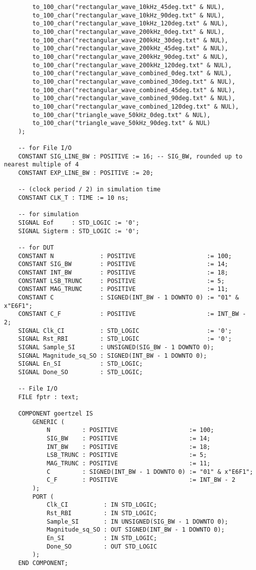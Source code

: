 \begin{lstlisting}
        to_100_char("rectangular_wave_10kHz_45deg.txt" & NUL),
        to_100_char("rectangular_wave_10kHz_90deg.txt" & NUL),
        to_100_char("rectangular_wave_10kHz_120deg.txt" & NUL),
        to_100_char("rectangular_wave_200kHz_0deg.txt" & NUL),
        to_100_char("rectangular_wave_200kHz_30deg.txt" & NUL),
        to_100_char("rectangular_wave_200kHz_45deg.txt" & NUL),
        to_100_char("rectangular_wave_200kHz_90deg.txt" & NUL),
        to_100_char("rectangular_wave_200kHz_120deg.txt" & NUL),
        to_100_char("rectangular_wave_combined_0deg.txt" & NUL),
        to_100_char("rectangular_wave_combined_30deg.txt" & NUL),
        to_100_char("rectangular_wave_combined_45deg.txt" & NUL),
        to_100_char("rectangular_wave_combined_90deg.txt" & NUL),
        to_100_char("rectangular_wave_combined_120deg.txt" & NUL),
        to_100_char("triangle_wave_50kHz_0deg.txt" & NUL),
        to_100_char("triangle_wave_50kHz_90deg.txt" & NUL)
    );

    -- for File I/O
    CONSTANT SIG_LINE_BW : POSITIVE := 16; -- SIG_BW, rounded up to nearest multiple of 4
    CONSTANT EXP_LINE_BW : POSITIVE := 20;

    -- (clock period / 2) in simulation time
    CONSTANT CLK_T : TIME := 10 ns;

    -- for simulation
    SIGNAL Eof     : STD_LOGIC := '0';
    SIGNAL Sigterm : STD_LOGIC := '0';

    -- for DUT
    CONSTANT N             : POSITIVE                    := 100;
    CONSTANT SIG_BW        : POSITIVE                    := 14;
    CONSTANT INT_BW        : POSITIVE                    := 18;
    CONSTANT LSB_TRUNC     : POSITIVE                    := 5;
    CONSTANT MAG_TRUNC     : POSITIVE                    := 11;
    CONSTANT C             : SIGNED(INT_BW - 1 DOWNTO 0) := "01" & x"E6F1";
    CONSTANT C_F           : POSITIVE                    := INT_BW - 2;
    SIGNAL Clk_CI          : STD_LOGIC                   := '0';
    SIGNAL Rst_RBI         : STD_LOGIC                   := '0';
    SIGNAL Sample_SI       : UNSIGNED(SIG_BW - 1 DOWNTO 0);
    SIGNAL Magnitude_sq_SO : SIGNED(INT_BW - 1 DOWNTO 0);
    SIGNAL En_SI           : STD_LOGIC;
    SIGNAL Done_SO         : STD_LOGIC;

    -- File I/O
    FILE fptr : text;

    COMPONENT goertzel IS
        GENERIC (
            N         : POSITIVE                    := 100;
            SIG_BW    : POSITIVE                    := 14;
            INT_BW    : POSITIVE                    := 18;
            LSB_TRUNC : POSITIVE                    := 5;
            MAG_TRUNC : POSITIVE                    := 11;
            C         : SIGNED(INT_BW - 1 DOWNTO 0) := "01" & x"E6F1";
            C_F       : POSITIVE                    := INT_BW - 2
        );
        PORT (
            Clk_CI          : IN STD_LOGIC;
            Rst_RBI         : IN STD_LOGIC;
            Sample_SI       : IN UNSIGNED(SIG_BW - 1 DOWNTO 0);
            Magnitude_sq_SO : OUT SIGNED(INT_BW - 1 DOWNTO 0);
            En_SI           : IN STD_LOGIC;
            Done_SO         : OUT STD_LOGIC
        );
    END COMPONENT;


\end{lstlisting}
